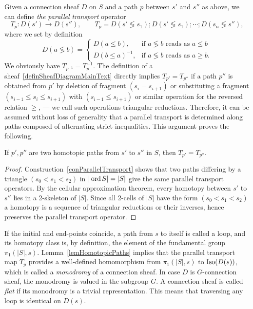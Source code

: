 \begin{con}\label{conParallelTransport}
Given a connection sheaf $D$ on $S$ and a path $p$ between $s'$ and $s''$ as above, we can define \emph{the parallel transport} operator
\[
T_p\colon D(s')\to D(s''),\qquad T_p=D(s'\lessgtr s_1);D(s'\lessgtr s_1);\cdots;D(s_n\lessgtr s''),
\]
where we set by definition
\[
D(a\lessgtr b)=\begin{cases}
                 D(a\leq b), & \mbox{if } a\lessgtr b \mbox{ reads as }a\leq b\\
                 D(b\leq a)^{-1}, & \mbox{if } a\lessgtr b \mbox{ reads as }a\geq b.
               \end{cases}
\]
We obviously have $T_{p^{-1}}=T_p^{-1}$. The definition of a sheaf~\ref{definSheafDiagramMainText} directly implies $T_{p'}=T_{p''}$ if a path $p''$ is obtained from $p'$ by deletion of fragment $(s_i=s_{i+1})$ or substituting a fragment $(s_{i-1}\leq s_{i}\leq s_{i+1})$ with $(s_{i-1}\leq s_{i+1})$ or similar operation for the reversed relation $\geq$, --- we call such operations triangular reductions. Therefore, it can be assumed without loss of generality that a parallel transport is determined along paths composed of alternating strict inequalities. This argument proves the following.
\end{con}

\begin{lem}\label{lemHomotopicPaths}
If $p',p''$ are two homotopic paths from $s'$ to $s''$ in $S$, then $T_{p'}=T_{p''}$.
\end{lem}

\begin{proof}
Construction~\ref{conParallelTransport} shows that two paths differing by a triangle $(s_0<s_1<s_2)$ in $|\operatorname{ord} S|=|S|$ give the same parallel transport operators. By the cellular approximation theorem, every homotopy between $s'$ to $s''$ lies in a 2-skeleton of $|S|$. Since all 2-cells of $|S|$ have the form $(s_0<s_1<s_2)$ a homotopy is a sequence of triangular reductions or their inverses, hence preserves the parallel transport operator.
\end{proof}

\begin{rem}\label{remMonodromy}
If the initial and end-points coincide, a path from $s$ to itself is called a loop, and its homotopy class is, by definition, the element of the fundamental group $\pi_1(|S|,s)$. Lemma~\ref{lemHomotopicPaths} implies that the parallel transport map $T_p$ provides a well-defined homomorphism from $\pi_1(|S|,s)$ to $\operatorname{Iso}(D(s))$, which is called a \emph{monodromy} of a connection sheaf. In case $D$ is $G$-connection sheaf, the monodromy is valued in the subgroup $G$. A connection sheaf is called \emph{flat} if its monodromy is a trivial representation. This means that traversing any loop is identical on $D(s)$.
\end{rem}

